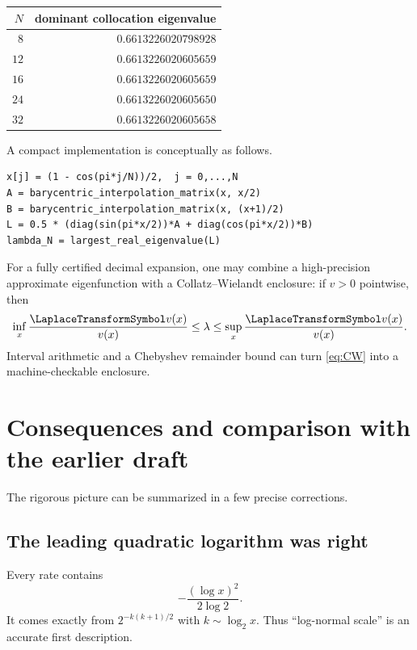 \documentclass[11pt,oneside]{article}
\theoremstyle{definition}
\theoremstyle{remark}
\begin{document}
\begin{center}
\begin{tabular}{@{}rr@{}}
\toprule
$N$ & dominant collocation eigenvalue \\
\midrule
$8$  & $0.6613226020798928$ \\
$12$ & $0.6613226020605659$ \\
$16$ & $0.6613226020605659$ \\
$24$ & $0.6613226020605650$ \\
$32$ & $0.6613226020605658$ \\
\bottomrule
\end{tabular}
\end{center}

A compact implementation is conceptually as follows.

\begin{lstlisting}[style=pseudo,caption={Chebyshev collocation for the Perron eigenvalue}]
x[j] = (1 - cos(pi*j/N))/2,  j = 0,...,N
A = barycentric_interpolation_matrix(x, x/2)
B = barycentric_interpolation_matrix(x, (x+1)/2)
L = 0.5 * (diag(sin(pi*x/2))*A + diag(cos(pi*x/2))*B)
lambda_N = largest_real_eigenvalue(L)
\end{lstlisting}

For a fully certified decimal expansion, one may combine a high-precision approximate
eigenfunction with a Collatz--Wielandt enclosure:
if $v>0$ pointwise, then
\begin{equation}\label{eq:CW}
 \inf_x\frac{\LaplaceTransformSymbol v(x)}{v(x)}
 \le\lambda\le
 \sup_x\frac{\LaplaceTransformSymbol v(x)}{v(x)}.
\end{equation}
Interval arithmetic and a Chebyshev remainder bound can turn \eqref{eq:CW} into a
machine-checkable enclosure.

\section{Consequences and comparison with the earlier draft}\label{sec:comparison}

The rigorous picture can be summarized in a few precise corrections.

\subsection{The leading quadratic logarithm was right}

Every rate contains
\[
 -\frac{(\log x)^2}{2\log2}.
\]
It comes exactly from
$2^{-k(k+1)/2}$ with $k\sim\log_2x$.  Thus ``log-normal scale'' is an accurate
first description.
\end{document}
